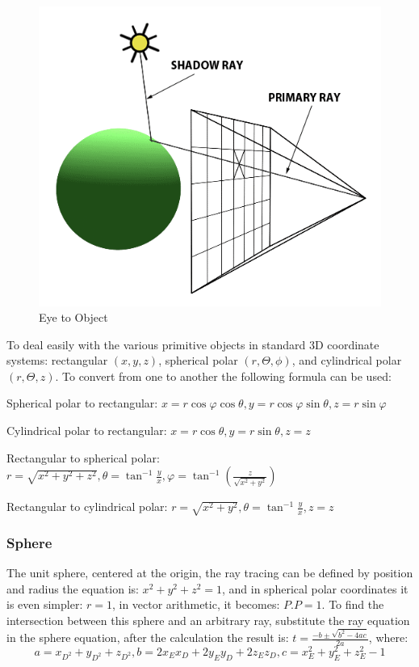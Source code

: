 \documentclass[a4paper, 12pt]{article}
\begin{document}
\begin{figure}[h] 
\centering
\includegraphics[scale=0.3]{ShD_light_source.png}
  \caption{Eye to Object}
   \label{fig:EyetoObject}
\end{figure}

To deal easily with the various primitive objects in standard 3D coordinate systems: rectangular $(x,y,z)$, spherical polar $(r, \Theta, \phi)$, and cylindrical polar $(r, \Theta, z)$. To convert from one to another the following formula can be used:

Spherical polar to rectangular: $x=r\cos{\varphi}\cos{\theta}, y=r\cos{\varphi}\sin{\theta}, z=r\sin{\varphi}$

Cylindrical polar to rectangular: $x=r\cos{\theta}, y=r\sin{\theta}, z=z$


Rectangular to spherical polar: $r=\sqrt{x^2+y^2+z^2}, \theta=\tan^{-1}{\frac{y}{x}}, \varphi=\tan^{-1}{(\frac{z}{\sqrt{x^2+y^2}})}$

Rectangular to cylindrical polar: $r=\sqrt{x^2+y^2}, \theta=\tan^{-1}{\frac{y}{x}}, z=z$ 
\cite{Learn Computer Graphics From Scratch}

\subsubsection{Sphere}
The unit sphere, centered at the origin, the ray tracing can be defined by position  and radius the equation is: $x^2+y^2+z^2=1$, and in spherical polar coordinates it is even simpler: $r=1$, in vector arithmetic, it becomes: $P.P=1$. To find the intersection between this sphere and an arbitrary ray, substitute the ray equation in the sphere equation, after the calculation the result is: $t=\frac{-b\pm\sqrt{b^2-4ac}}{2a}$, where: $$a=x_{D^2}+y_{D^2}+z_{D^2}, 
b={2 x_E x_D + 2 y_E y_D + 2 z_E z_D}, c=x_E^2 + y_E^2 + z_E^2 - 1 $$
\end{document}
